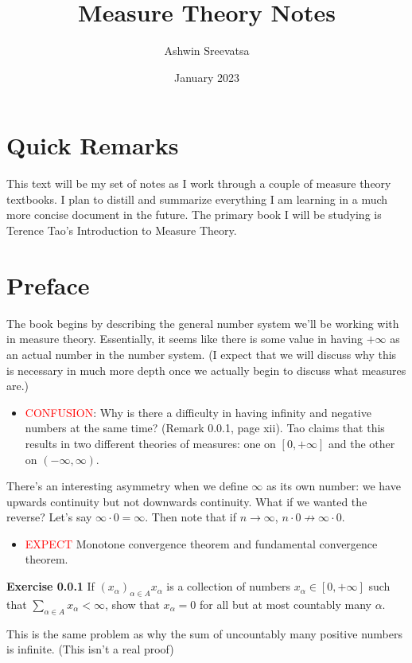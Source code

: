 \documentclass[answers,12pt]{exam}
\title{Measure Theory Notes}
\author{Ashwin Sreevatsa}
\date{January 2023}
\begin{document}
\maketitle
\setcounter{section}{-1}

\section*{Quick Remarks}
This text will be my set of notes as I work through a couple of measure theory textbooks.
I plan to distill and summarize everything I am learning in a much more concise document in the future.
The primary book I will be studying is Terence Tao's Introduction to Measure Theory.

\section{Preface}

The book begins by describing the general number system we'll be working with in measure theory. 
Essentially, it seems like there is some value in having $ + \infty$ as an actual number in the number system.
(I expect that we will discuss why this is necessary in much more depth once we actually begin to discuss what measures are.)

\begin{itemize}
    \item \textcolor{red}{CONFUSION}: Why is there a difficulty in having infinity and negative numbers at the same time? (Remark 0.0.1, page xii).
    Tao claims that this results in two different theories of measures: one on $[0,+\infty]$ and the other on $(-\infty, \infty)$.
\end{itemize}

There's an interesting asymmetry when we define $\infty$ as its own number: we have upwards continuity but not downwards continuity.
What if we wanted the reverse? 
Let's say $\infty \cdot 0 = \infty$. 
Then note that if $n \to \infty$, $n \cdot 0 \not \to \infty \cdot 0$.

\begin{itemize}
    \item \textcolor{red}{EXPECT} Monotone convergence theorem and fundamental convergence theorem.
\end{itemize}


\textbf{Exercise 0.0.1} If $(x_{\alpha})_{\alpha \in A} x_{\alpha}$
 is a collection of numbers $x_{\alpha} \in [0, +\infty]$
 such that $\sum_{\alpha \in A}x_{\alpha}< \infty$,
 show that $x_{\alpha}=0$ for all
 but at most countably many $\alpha$.
 \begin{solution}
     This is the same problem as why the sum of uncountably many positive numbers is infinite. (This isn't a real proof)
 \end{solution}
\end{document}
